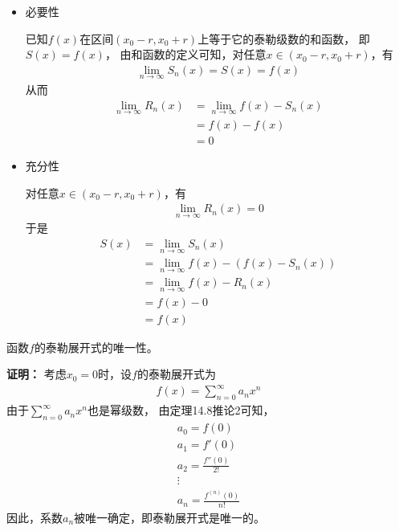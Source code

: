 \documentclass{article}
\begin{document}
\begin{itemize}
  \item 必要性

        已知$f(x)$在区间$(x_0 - r, x_0 + r)$上等于它的泰勒级数的和函数，
        即$S(x) = f(x)$，
        由和函数的定义可知，对任意$x \in (x_0 - r, x_0 + r)$，有
        \begin{align*}
          \lim\limits_{n\to\infty} S_n(x) = S(x) = f(x)
        \end{align*}
        从而
        \begin{align*}
          \lim\limits_{n\to\infty} R_n(x)
           & = \lim\limits_{n\to\infty} f(x) - S_n(x) \\
           & = f(x) - f(x)                            \\
           & = 0
        \end{align*}

  \item 充分性

        对任意$x \in (x_0 - r, x_0 + r)$，有
        \begin{align*}
          \lim\limits_{n\to\infty} R_n(x) = 0
        \end{align*}
        于是
        \begin{align*}
          S(x)
           & = \lim\limits_{n\to\infty} S_n(x)                 \\
           & = \lim\limits_{n\to\infty} f(x) - (f(x) - S_n(x)) \\
           & = \lim\limits_{n\to\infty} f(x) - R_n(x)          \\
           & = f(x) - 0                                        \\
           & = f(x)
        \end{align*}
\end{itemize}

\begin{zremark}
  函数$f$的泰勒展开式的唯一性。
\end{zremark}
\textbf{证明：}
考虑$x_0 = 0$时，设$f$的泰勒展开式为
\begin{align*}
  f(x) = \sum \limits_{n = 0}^{\infty} a_n x^n
\end{align*}
由于$\sum \limits_{n = 0}^{\infty} a_n x^n$也是幂级数，
由定理14.8推论2可知，
\begin{align*}
  a_0 = f(0)              \\
  a_1 = f'(0)             \\
  a_2 = \frac{f''(0)}{2!} \\
  \vdots                  \\
  a_n = \frac{f^{(n)}(0)}{n!}
\end{align*}
因此，系数$a_n$被唯一确定，即泰勒展开式是唯一的。
\end{document}
